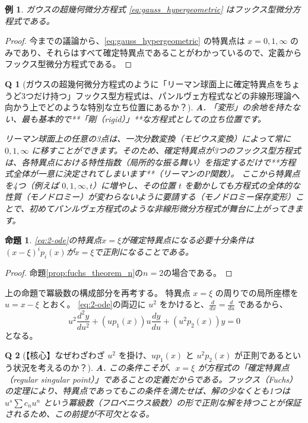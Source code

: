 \documentclass[paper=a4, fontsize=11pt]{jlreq} %
\theoremstyle{break}
\newtheorem{proposition}[theorem]{命題}
\newtheorem{example}[theorem]{例}
\theoremstyle{qa}
\newtheorem*{Q}{Q}
\theoremstyle{remark} %
\begin{document}
\begin{example}
    ガウスの超幾何微分方程式 \eqref{eq:gauss_hypergeometric} はフックス型微分方程式である。
\end{example}

\begin{proof}
    今までの議論から、\eqref{eq:gauss_hypergeometric} の特異点は $x=0,1,\infty$ のみであり、それらはすべて確定特異点であることがわかっているので、定義からフックス型微分方程式である。
\end{proof}

\begin{Q}[ガウスの超幾何微分方程式のように「リーマン球面上に確定特異点をちょうど3つだけ持つ」フックス型方程式は、パンルヴェ方程式などの非線形理論へ向かう上でどのような特別な立ち位置にあるか？]
\textbf{A.} 「変形」の余地を持たない、最も基本的で**「剛（rigid）」**な方程式としての立ち位置です。

リーマン球面上の任意の3点は、一次分数変換（モビウス変換）によって常に $0, 1, \infty$ に移すことができます。そのため、確定特異点が3つのフックス型方程式は、各特異点における特性指数（局所的な振る舞い）を指定するだけで**方程式全体が一意に決定されてしまいます**（リーマンのP関数）。
ここから特異点を4つ（例えば $0, 1, \infty, t$）に増やし、その位置 $t$ を動かしても方程式の全体的な性質（モノドロミー）が変わらないように要請する（モノドロミー保存変形）ことで、初めてパンルヴェ方程式のような非線形微分方程式が舞台に上がってきます。
\end{Q}
\begin{proposition}
    \eqref{eq:2-ode}の特異点$x=\xi$が確定特異点になる必要十分条件は$(x-\xi)^{i}p_{i}(x)$が$x=\xi$で正則になることである。
\end{proposition}

\begin{proof}
    命題\ref{prop:fuchs_theorem_n}の$n=2$の場合である。
\end{proof}
上の命題で冪級数の構成部分を再考する。
特異点 $x=\xi$ の周りでの局所座標を $u = x - \xi$ とおく。
\eqref{eq:2-ode}の両辺に $u^{2}$ をかけると、$\frac{d}{dx} = \frac{d}{du}$ であるから、
\[
u^{2}\frac{d^{2}y}{du^{2}} + (u p_{1}(x)) u\frac{dy}{du} + (u^{2} p_{2}(x)) y = 0
\]
となる。

\begin{Q}[【核心】なぜわざわざ $u^2$ を掛け、$u p_1(x)$ と $u^2 p_2(x)$ が正則であるという状況を考えるのか？]
\textbf{A.} この条件こそが、$x=\xi$ が方程式の「確定特異点（regular singular point）」であることの定義だからである。フックス（Fuchs）の定理により、特異点であってもこの条件を満たせば、解の少なくとも1つは $u^s \sum c_n u^n$ という冪級数（フロベニウス級数）の形で正則な解を持つことが保証されるため、この前提が不可欠となる。
\end{Q}
\end{document}
